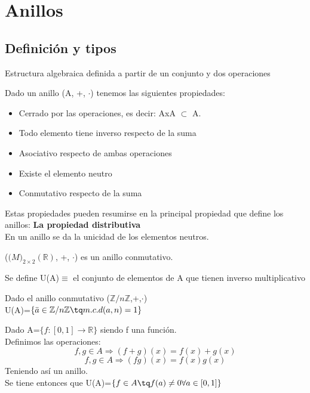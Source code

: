 \documentclass[nochap]{apuntes}
\begin{document}
\section{Anillos}
\subsection{Definición y tipos}
\begin{defn}[Anillo]
 Estructura algebraica definida a partir de un conjunto y dos operaciones
\end{defn}
Dado un anillo (A, +, $\cdot$) tenemos las siguientes propiedades:
\begin{itemize}
 \item Cerrado por las operaciones, es decir: AxA $\subset$ A. 
 \item Todo elemento tiene inverso respecto de la suma
 \item Asociativo respecto de ambas operaciones
 \item Existe el elemento neutro
 \item Conmutativo respecto de la suma
\end{itemize}
Estas propiedades pueden resumirse en la principal propiedad que define los anillos: \textbf{La propiedad distributiva}\\
En un anillo se da la unicidad de los elementos neutros.
\begin{example}
 ($\mathbb(M)_{2\times 2}(\mathbb{R})$, +, $\cdot$) es un anillo conmutativo.
\end{example}

\begin{defn}[Unidades]
 Se define U(A)$\equiv$  el conjunto de elementos de A que tienen inverso multiplicativo
\end{defn}

\begin{example}
 Dado el anillo conmutativo ($\mathbb{Z}/n\mathbb{Z}$,+,$\cdot$)\\
 U(A)=$\{\bar{a}\in\mathbb{Z}/n\mathbb{Z} \tq m.c.d(a,n)=1\}$
\end{example}

\begin{example}
 Dado A=$\{f:[0,1] \rightarrow \mathbb{R}\}$  siendo f una función.\\
 Definimos las operaciones: 
 \[f, g \in A \Rightarrow (f+g)(x)=f(x)+g(x)\]
 \[f, g \in A \Rightarrow (fg)(x)=f(x)g(x)\]
 Teniendo así un anillo.\\
 Se tiene entonces que U(A)=$\{f\in A \tq f(a) \neq 0 \forall a \in [0,1]\}$
\end{example}
\end{document}
